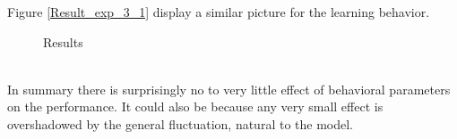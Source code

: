 \documentclass[a4paper]{article}
\begin{document}
Figure \ref{Result_exp_3_1} display a similar picture for the learning behavior. \\
\begin{figure}[!ht]
\caption{Results}
\label{Result_exp_3_2}
\end{figure}\\
In summary there is surprisingly no to very little effect of behavioral parameters on the performance. It could also be because any 
very small effect is overshadowed by the general fluctuation, natural to the model. 
\clearpage
\end{document}
